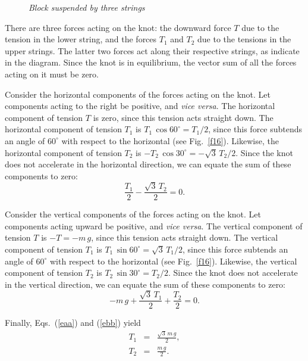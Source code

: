 \begin{figure}
\epsfysize=2in
\centerline{}
\caption{\em Block suspended by three strings}\label{f27}   
\end{figure}

There are three forces acting on the knot: the downward force $T$ due to the
tension in the lower string, and the forces $T_1$ and $T_2$ due to the tensions
in the upper strings. The latter two forces act along their respective strings,
as indicate in the diagram.
Since the knot is in equilibrium, the vector sum of all the forces acting
on it must be zero. 

Consider the horizontal components of the
forces acting on the knot. Let components acting to the right be positive, and
{\em vice versa}. 
The horizontal component of tension $T$ is
zero, since this tension acts straight down. The horizontal
component of tension $T_1$ is $T_1\,\cos 60^\circ = T_1/2$, since this
force  subtends an angle of $60^\circ$ with respect to the horizontal (see Fig.~\ref{f16}). 
Likewise, the
horizontal component of tension $T_2$ is $-T_2\,\cos 30^\circ = -\sqrt{3}\,T_2/2$. 
Since the knot does not accelerate in the horizontal direction, we can equate
the sum of these components to zero:
\begin{equation}\label{eaa}
\frac{T_1}{2} -\frac{\sqrt{3}\,T_2}{2} = 0.
\end{equation}

Consider the vertical components of the forces acting on the knot. Let
components acting upward be positive, and
{\em vice versa}. The vertical component of tension $T$ is
$-T=-m\,g$, since this tension acts straight down. The vertical
component of tension $T_1$ is $T_1\,\sin 60^\circ = \sqrt{3}\,T_1/2$, since this
force  subtends an angle of $60^\circ$ with respect to the horizontal (see Fig.~\ref{f16}). 
Likewise, the
vertical component of tension $T_2$ is $T_2\,\sin 30^\circ = T_2/2$. 
Since the knot does not accelerate in the vertical direction, we can equate
the sum of these components to zero:
\begin{equation}\label{ebb}
-m\,g+\frac{\sqrt{3}\,T_1}{2} + \frac{T_2}{2} = 0.
\end{equation}

Finally, Eqs.~(\ref{eaa}) and (\ref{ebb}) yield
\begin{eqnarray}
T_1 &=& \frac{\sqrt{3}\,m\,g}{2},\\[0.5ex]
T_2 &=& \frac{m\,g}{2}.
\end{eqnarray}


